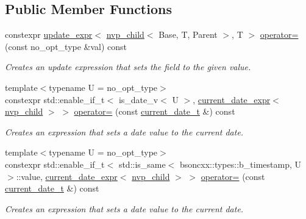 \subsection*{Public Member Functions}
\begin{DoxyCompactItemize}
\item 
constexpr \hyperlink{classmongo__odm_1_1update__expr}{update\+\_\+expr}$<$ \hyperlink{classmongo__odm_1_1nvp__child}{nvp\+\_\+child}$<$ Base, T, Parent $>$, T $>$ \hyperlink{classmongo__odm_1_1nvp__child_abc2a07e7d92692f3c4f8710f4c264ba6}{operator=} (const no\+\_\+opt\+\_\+type \&val) const \hypertarget{classmongo__odm_1_1nvp__child_abc2a07e7d92692f3c4f8710f4c264ba6}{}\label{classmongo__odm_1_1nvp__child_abc2a07e7d92692f3c4f8710f4c264ba6}

\begin{DoxyCompactList}\small\item\em Creates an update expression that sets the field to the given value. \end{DoxyCompactList}\item 
{\footnotesize template$<$typename U  = no\+\_\+opt\+\_\+type$>$ }\\constexpr std\+::enable\+\_\+if\+\_\+t$<$ is\+\_\+date\+\_\+v$<$ U $>$, \hyperlink{classmongo__odm_1_1current__date__expr}{current\+\_\+date\+\_\+expr}$<$ \hyperlink{classmongo__odm_1_1nvp__child}{nvp\+\_\+child} $>$ $>$ \hyperlink{classmongo__odm_1_1nvp__child_afa70a98ddfe7c9d3d7a066e9227b53ab}{operator=} (const \hyperlink{structmongo__odm_1_1current__date__t}{current\+\_\+date\+\_\+t} \&) const 
\begin{DoxyCompactList}\small\item\em Creates an expression that sets a date value to the current date. \end{DoxyCompactList}\item 
{\footnotesize template$<$typename U  = no\+\_\+opt\+\_\+type$>$ }\\constexpr std\+::enable\+\_\+if\+\_\+t$<$ std\+::is\+\_\+same$<$ bsoncxx\+::types\+::b\+\_\+timestamp, U $>$\+::value, \hyperlink{classmongo__odm_1_1current__date__expr}{current\+\_\+date\+\_\+expr}$<$ \hyperlink{classmongo__odm_1_1nvp__child}{nvp\+\_\+child} $>$ $>$ \hyperlink{classmongo__odm_1_1nvp__child_a78930ea7b294a162cba2900a4f1ebf93}{operator=} (const \hyperlink{structmongo__odm_1_1current__date__t}{current\+\_\+date\+\_\+t} \&) const 
\begin{DoxyCompactList}\small\item\em Creates an expression that sets a date value to the current date. \end{DoxyCompactList}\item 

\end{DoxyCompactItemize}

